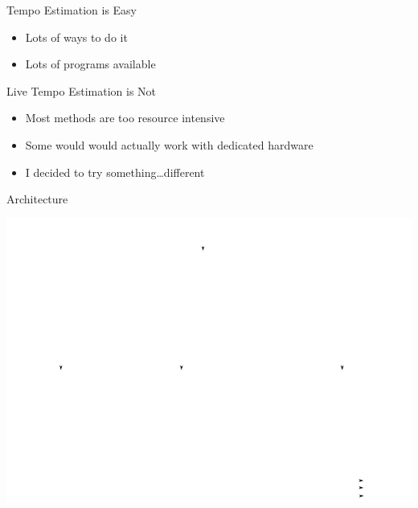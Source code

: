 \documentclass[10pt]{beamer}
\title{\projname}
\subtitle{A Hardware Beat Tracker}
\author{Joseph Colosimo \\ Group 6}
\date{May 15, 2013}
\institute{Massachusetts Institute of Technology}
\begin{document}
\begin{frame}
    \titlepage
\end{frame}

\begin{frame}{Tempo Estimation is Easy}
    \begin{center}
        \begin{itemize}
            \item<2-> Lots of ways to do it
            \item<3-> Lots of programs available
        \end{itemize}
    \end{center}
\end{frame}

\begin{frame}{Live Tempo Estimation is Not}
    \begin{center}
        \begin{itemize}
            \item<2-> Most methods are too resource intensive
            \item<3-> Some would would actually work with dedicated hardware
            \item<4-> I decided to try something\ldots different
        \end{itemize}
    \end{center}
\end{frame}

\begin{frame}{Architecture}
    \begin{center}
        \includegraphics{fig/architecture.pdf}
    \end{center}
\end{frame}
\end{document}
